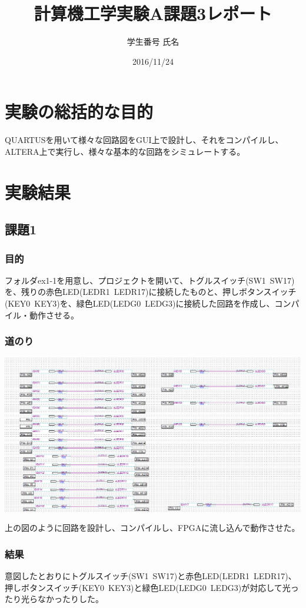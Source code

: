 \documentclass[a4paper]{jarticle}
\title{計算機工学実験A課題3レポート}
\author{学生番号 氏名}
\date{2016/11/24}
\begin{document}
\maketitle
\section{実験の総括的な目的}
QUARTUSを用いて様々な回路図をGUI上で設計し、それをコンパイルし、ALTERA上で実行し、様々な基本的な回路をシミュレートする。
\section{実験結果}
\subsection{課題1}
\subsubsection{目的}
フォルダex1-1を用意し、プロジェクトを開いて、トグルスイッチ(SW1~SW17)を、残りの赤色LED(LEDR1~LEDR17)に接続したものと、押しボタンスイッチ(KEY0~KEY3)を、緑色LED(LEDG0~LEDG3)に接続した回路を作成し、コンパイル・動作させる。
\subsubsection{道のり}
\begin{center}
	\includegraphics[width=15cm]{work1.PNG}
\end{center}
上の図のように回路を設計し、コンパイルし、FPGAに流し込んで動作させた。
\subsubsection{結果}
意図したとおりにトグルスイッチ(SW1~SW17)と赤色LED(LEDR1~LEDR17)、押しボタンスイッチ(KEY0~KEY3)と緑色LED(LEDG0~LEDG3)が対応して光ったり光らなかったりした。
\end{document}
